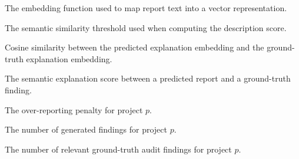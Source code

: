 \begin{denotation}[4cm]
\item[$E(\cdot)$]{
  The embedding function used to map report text into a vector representation.
}

\item[$\tau$]{
  The semantic similarity threshold used when computing the description score.
}

\item[$\cos(E(p), E(g))$]{
  Cosine similarity between the predicted explanation embedding and the ground-truth explanation embedding.
}

\item[$\mathrm{DescriptionScore}(p,g)$]{
  The semantic explanation score between a predicted report and a ground-truth finding.
}

\item[$\mathrm{Penalty}(p)$]{
  The over-reporting penalty for project $p$.
}

\item[$\#\mathrm{Predictions}(p)$]{
  The number of generated findings for project $p$.
}

\item[$\#\mathrm{GroundTruth}(p)$]{
  The number of relevant ground-truth audit findings for project $p$.
}

\end{denotation}
